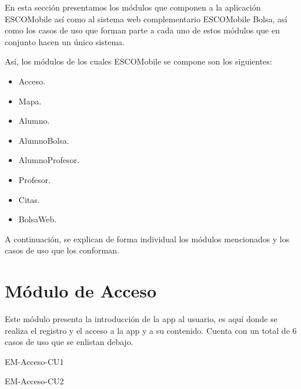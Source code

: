 \noindent
En esta sección presentamos los módulos que componen a la aplicación ESCOMobile así como al sistema web
complementario ESCOMobile Bolsa, así como los casos de uso que forman parte a cada uno de estos módulos
que en conjunto hacen un único sistema.   

\noindent
\newline
Así, los módulos de los cuales ESCOMobile se compone son los siguientes: 
	\begin{itemize}
        \item Acceso.
        \item Mapa.
        \item Alumno.
        \item AlumnoBolsa.
        \item AlumnoProfesor.
        \item Profesor.
        \item Citas.
        \item BolsaWeb.
	\end{itemize}

\noindent
A continuación, se explican de forma individual los módulos mencionados y los casos de uso que los conforman. 




\section{Módulo de Acceso}

\noindent
Este módulo presenta la introducción de la app al usuario, es aquí donde se realiza el registro y el acceso 
a la app y a su contenido. Cuenta con un total de 6 casos de uso que se enlistan debajo.

\begin{requisitos}{EM-Acceso-CU1}
\end{requisitos}

\begin{requisitos}{EM-Acceso-CU2}
\end{requisitos}

